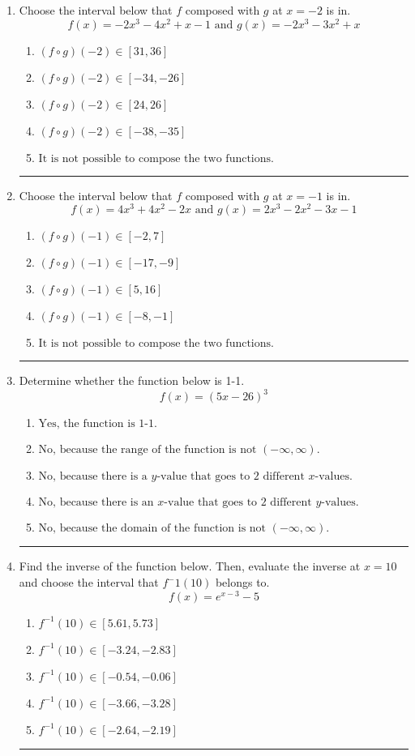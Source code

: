 \documentclass[14pt]{extbook}
\newcommand{\litem}[1]{\item#1\hspace*{-1cm}\rule{\textwidth}{0.4pt}}
\begin{document}
\begin{enumerate}
\litem{
Choose the interval below that $f$ composed with $g$ at $x=-2$ is in.\[ f(x) = -2x^{3} -4 x^{2} +x -1 \text{ and } g(x) = -2x^{3} -3 x^{2} +x \]\begin{enumerate}[label=\Alph*.]
\item \( (f \circ g)(-2) \in [31, 36] \)
\item \( (f \circ g)(-2) \in [-34, -26] \)
\item \( (f \circ g)(-2) \in [24, 26] \)
\item \( (f \circ g)(-2) \in [-38, -35] \)
\item \( \text{It is not possible to compose the two functions.} \)

\end{enumerate} }
\litem{
Choose the interval below that $f$ composed with $g$ at $x=-1$ is in.\[ f(x) = 4x^{3} +4 x^{2} -2 x \text{ and } g(x) = 2x^{3} -2 x^{2} -3 x -1 \]\begin{enumerate}[label=\Alph*.]
\item \( (f \circ g)(-1) \in [-2, 7] \)
\item \( (f \circ g)(-1) \in [-17, -9] \)
\item \( (f \circ g)(-1) \in [5, 16] \)
\item \( (f \circ g)(-1) \in [-8, -1] \)
\item \( \text{It is not possible to compose the two functions.} \)

\end{enumerate} }
\litem{
Determine whether the function below is 1-1.\[ f(x) = (5 x - 26)^3 \]\begin{enumerate}[label=\Alph*.]
\item \( \text{Yes, the function is 1-1.} \)
\item \( \text{No, because the range of the function is not $(-\infty, \infty)$.} \)
\item \( \text{No, because there is a $y$-value that goes to 2 different $x$-values.} \)
\item \( \text{No, because there is an $x$-value that goes to 2 different $y$-values.} \)
\item \( \text{No, because the domain of the function is not $(-\infty, \infty)$.} \)

\end{enumerate} }
\litem{
Find the inverse of the function below. Then, evaluate the inverse at $x = 10$ and choose the interval that $f^-1(10)$ belongs to.\[ f(x) = e^{x-3}-5 \]\begin{enumerate}[label=\Alph*.]
\item \( f^{-1}(10) \in [5.61, 5.73] \)
\item \( f^{-1}(10) \in [-3.24, -2.83] \)
\item \( f^{-1}(10) \in [-0.54, -0.06] \)
\item \( f^{-1}(10) \in [-3.66, -3.28] \)
\item \( f^{-1}(10) \in [-2.64, -2.19] \)


\end{enumerate}}
\end{enumerate}
\end{document}
